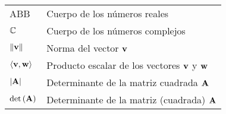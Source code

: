 \chapter*{\notationname}
\pagestyle{especial}
\chaptermark{\notationname}
{}
\begin{longtable}{p{3cm}p{8.5cm}}

ABB & Cuerpo de los números reales \\
$\mathbb{C}$ & Cuerpo de los números complejos\\
$\left\| \mathbf{v} \right\|$ & Norma del vector $\mathbf{v}$ \\
$\left\langle {\mathbf{v}, \mathbf{w}} \right\rangle$ & Producto escalar de los vectores $\mathbf{v}$ y $\mathbf{w}$\\
$\left| {\mathbf{A}} \right|$ &Determinante de la matriz cuadrada $\mathbf{A}$\\
$\textrm{det}\left( {\mathbf{A}} \right)$ &Determinante de la matriz (cuadrada) $\mathbf{A}$\\

\end{longtable}

